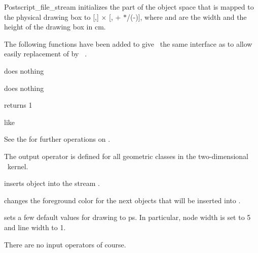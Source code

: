\begin{ccRefClass} {Postscript_file_stream}
{initializes the  part of the object space that is mapped to the physical
drawing box to [,] $\times$ [, + 
$*$/(-)], where  and  
are the width and the height of the drawing box in cm.}

The following functions have been added to give \ccRefName\ the same interface
as  to allow easily replacement of  by
\ccRefName\ . 

{does nothing}

{does nothing}

{returns 1}

{like }

See the 
\cite{cgal:mnsu-lum} for further operations on .

\def\ccTagRmEigenClassName{\ccFalse}


The output operator is defined for all geometric classes in the two-dimensional
\cgal\ kernel.

       {inserts object  into the stream \ccVar.}

       {changes the foreground color for the next objects that
        will be inserted into \ccVar.}

{sets a few default values for drawing to ps. In particular, node width is
set to 5 and line width to 1.}

There are no input operators of course.

\end{ccRefClass} 
